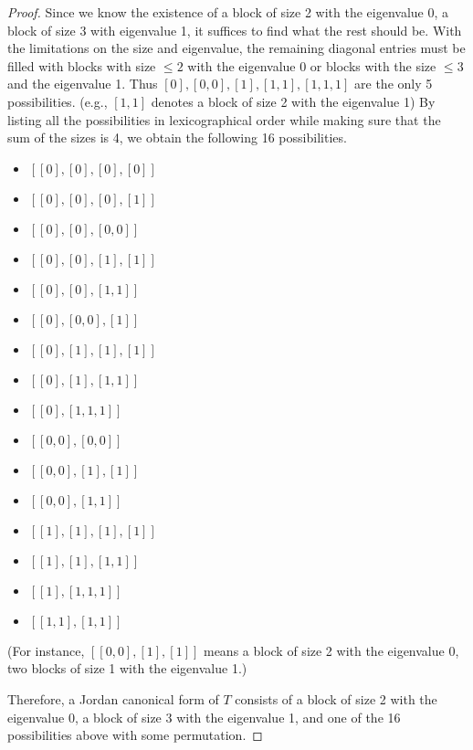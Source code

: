 \documentclass[12pt, psamsfonts]{amsart}
\theoremstyle{definition}
\theoremstyle{remark}
\numberwithin{equation}{section}
\begin{document}
\begin{proof}
  Since we know the existence of a block of size 2 with the eigenvalue 0, a block of size 3 with eigenvalue 1, it suffices to find what the rest should be.
  With the limitations on the size and eigenvalue, the remaining diagonal entries must be filled with blocks with size $\leq 2$ with the eigenvalue 0 or blocks with the size $\leq 3$ and the eigenvalue 1.
  Thus $[0], [0, 0], [1], [1, 1], [1, 1, 1]$ are the only 5 possibilities.
  (e.g., $[1, 1]$ denotes a block of size 2 with the eigenvalue 1)
  By listing all the possibilities in lexicographical order while making sure that the sum of the sizes is 4, we obtain the following 16 possibilities.
  \begin{itemize}
    \item $[[0], [0], [0], [0]]$
    \item $[[0], [0], [0], [1]]$
    \item $[[0], [0], [0, 0]]$
    \item $[[0], [0], [1], [1]]$
    \item $[[0], [0], [1, 1]]$
    \item $[[0], [0, 0], [1]]$
    \item $[[0], [1], [1], [1]]$
    \item $[[0], [1], [1, 1]]$
    \item $[[0], [1, 1, 1]]$
    \item $[[0, 0], [0, 0]]$
    \item $[[0, 0], [1], [1]]$
    \item $[[0, 0], [1, 1]]$
    \item $[[1], [1], [1], [1]]$
    \item $[[1], [1], [1, 1]]$
    \item $[[1], [1, 1, 1]]$
    \item $[[1, 1], [1, 1]]$
  \end{itemize}

  (For instance, $[[0, 0], [1], [1]]$ means a block of size 2 with the eigenvalue 0, two blocks of size 1 with the eigenvalue 1.)

  Therefore, a Jordan canonical form of $T$ consists of a block of size 2 with the eigenvalue 0, a block of size 3 with the eigenvalue 1, and one of the 16 possibilities above with some permutation.
\end{proof}
\end{document}
